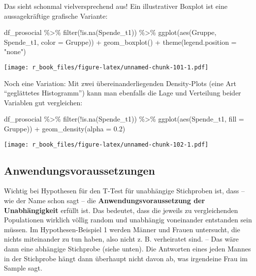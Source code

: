\documentclass[
]{book}
\newenvironment{Shaded}{\begin{snugshade}}{\end{snugshade}}
\newcommand{\AttributeTok}[1]{\textcolor[rgb]{0.77,0.63,0.00}{#1}}
\newcommand{\FloatTok}[1]{\textcolor[rgb]{0.00,0.00,0.81}{#1}}
\newcommand{\FunctionTok}[1]{\textcolor[rgb]{0.00,0.00,0.00}{#1}}
\newcommand{\NormalTok}[1]{#1}
\newcommand{\SpecialCharTok}[1]{\textcolor[rgb]{0.00,0.00,0.00}{#1}}
\newcommand{\StringTok}[1]{\textcolor[rgb]{0.31,0.60,0.02}{#1}}
\begin{document}
Das sieht schonmal vielversprechend aus! Ein illustrativer Boxplot ist eine aussagekräftige grafische Variante:

\begin{Shaded}
\begin{Highlighting}[]
\NormalTok{df\_prosocial }\SpecialCharTok{\%\textgreater{}\%} 
  \FunctionTok{filter}\NormalTok{(}\SpecialCharTok{!}\FunctionTok{is.na}\NormalTok{(Spende\_t1)) }\SpecialCharTok{\%\textgreater{}\%} 
  \FunctionTok{ggplot}\NormalTok{(}\FunctionTok{aes}\NormalTok{(Gruppe, Spende\_t1, }\AttributeTok{color =}\NormalTok{ Gruppe)) }\SpecialCharTok{+}
  \FunctionTok{geom\_boxplot}\NormalTok{() }\SpecialCharTok{+}
  \FunctionTok{theme}\NormalTok{(}\AttributeTok{legend.position =} \StringTok{"none"}\NormalTok{)}
\end{Highlighting}
\end{Shaded}

\texttt{[image: r\_book\_files/figure-latex/unnamed-chunk-101-1.pdf]}

Noch eine Variation: Mit zwei übereinanderliegenden Density-Plots (eine Art ``geglättetes Histogramm'') kann man ebenfalls die Lage und Verteilung beider Variablen gut vergleichen:

\begin{Shaded}
\begin{Highlighting}[]
\NormalTok{df\_prosocial }\SpecialCharTok{\%\textgreater{}\%} 
  \FunctionTok{filter}\NormalTok{(}\SpecialCharTok{!}\FunctionTok{is.na}\NormalTok{(Spende\_t1)) }\SpecialCharTok{\%\textgreater{}\%} 
  \FunctionTok{ggplot}\NormalTok{(}\FunctionTok{aes}\NormalTok{(Spende\_t1, }\AttributeTok{fill =}\NormalTok{ Gruppe)) }\SpecialCharTok{+} 
  \FunctionTok{geom\_density}\NormalTok{(}\AttributeTok{alpha =} \FloatTok{0.2}\NormalTok{)}
\end{Highlighting}
\end{Shaded}

\texttt{[image: r\_book\_files/figure-latex/unnamed-chunk-102-1.pdf]}

\hypertarget{anwendungsvoraussetzungen}{%
\subsection{Anwendungsvoraussetzungen}\label{anwendungsvoraussetzungen}}

Wichtig bei Hypothesen für den T-Test für unabhängige Stichproben ist, dass -- wie der Name schon sagt -- die \textbf{Anwendungsvoraussetzung der Unabhängigkeit} erfüllt ist. Das bedeutet, dass die jeweils zu vergleichenden Populationen wirklich völlig random und unabhängig voneinander entstanden sein müssen. Im Hypothesen-Beispiel 1 werden Männer und Frauen untersucht, die nichts miteinander zu tun haben, also nicht z. B. verheiratet sind. -- Das wäre dann eine abhängige Stichprobe (siehe unten). Die Antworten eines jeden Mannes in der Stichprobe hängt dann überhaupt nicht davon ab, was irgendeine Frau im Sample sagt.
\end{document}
